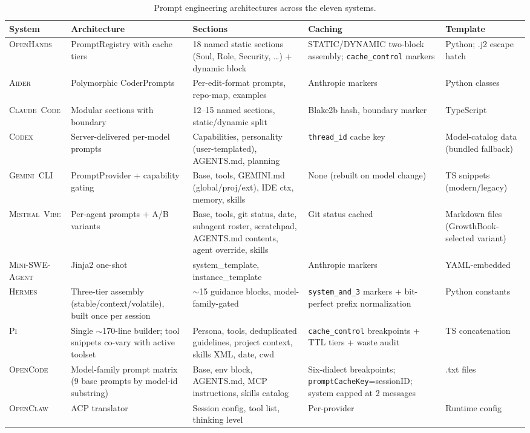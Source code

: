 \documentclass[11pt,a4paper]{article}
\newcommand{\clcode}{\textsc{Claude~Code}\xspace}
\newcommand{\cdx}{\textsc{Codex}\xspace}
\newcommand{\oh}{\textsc{OpenHands}\xspace}
\newcommand{\adr}{\textsc{Aider}\xspace}
\newcommand{\mswe}{\textsc{Mini-SWE-Agent}\xspace}
\newcommand{\ocl}{\textsc{OpenClaw}\xspace}
\newcommand{\vibe}{\textsc{Mistral~Vibe}\xspace}
\newcommand{\gemini}{\textsc{Gemini~CLI}\xspace}
\newcommand{\hrm}{\textsc{Hermes}\xspace}
\newcommand{\pib}{\textsc{Pi}\xspace}
\newcommand{\ocd}{\textsc{OpenCode}\xspace}
\begin{document}
\begin{table}[H]
\centering
\caption{Prompt engineering architectures across the eleven systems.}
\label{tab:prompts}
\scriptsize
\renewcommand{\arraystretch}{1.25}
\begin{tabularx}{\textwidth}{@{}l L{3.2cm} L{3.4cm} L{3.4cm} L{2cm}@{}}
\toprule
\textbf{System} & \textbf{Architecture} & \textbf{Sections} & \textbf{Caching} & \textbf{Template} \\
\midrule
\oh{}     & PromptRegistry with cache tiers & 18 named static sections (Soul, Role, Security, \ldots) + dynamic block & STATIC/DYNAMIC two-block assembly; \texttt{cache\_control} markers & Python; .j2 escape hatch \\
\adr{}    & Polymorphic CoderPrompts & Per-edit-format prompts, repo-map, examples & Anthropic markers & Python classes \\
\clcode{} & Modular sections with boundary & 12--15 named sections, static/dynamic split & Blake2b hash, boundary marker & TypeScript \\
\cdx{}    & Server-delivered per-model prompts & Capabilities, personality (user-templated), AGENTS.md, planning & \texttt{thread\_id} cache key & Model-catalog data (bundled fallback) \\
\gemini{} & PromptProvider + capability gating & Base, tools, GEMINI.md (global/proj/ext), IDE ctx, memory, skills & None (rebuilt on model change) & TS snippets (modern/legacy) \\
\vibe{}   & Per-agent prompts + A/B variants & Base, tools, git status, date, subagent roster, scratchpad, AGENTS.md contents, agent override, skills & Git status cached & Markdown files (GrowthBook-selected variant) \\
\mswe{}   & Jinja2 one-shot & system\_template, instance\_template & Anthropic markers & YAML-embedded \\
\hrm{}    & Three-tier assembly (stable/context/volatile), built once per session & $\sim$15 guidance blocks, model-family-gated & \texttt{system\_and\_3} markers + bit-perfect prefix normalization & Python constants \\
\pib{}    & Single $\sim$170-line builder; tool snippets co-vary with active toolset & Persona, tools, deduplicated guidelines, project context, skills XML, date, cwd & \texttt{cache\_control} breakpoints + TTL tiers + waste audit & TS concatenation \\
\ocd{}    & Model-family prompt matrix (9 base prompts by model-id substring) & Base, env block, AGENTS.md, MCP instructions, skills catalog & Six-dialect breakpoints; \texttt{promptCacheKey}=sessionID; system capped at 2 messages & .txt files \\
\ocl{}    & ACP translator & Session config, tool list, thinking level & Per-provider & Runtime config \\
\bottomrule
\end{tabularx}
\end{table}
\end{document}
